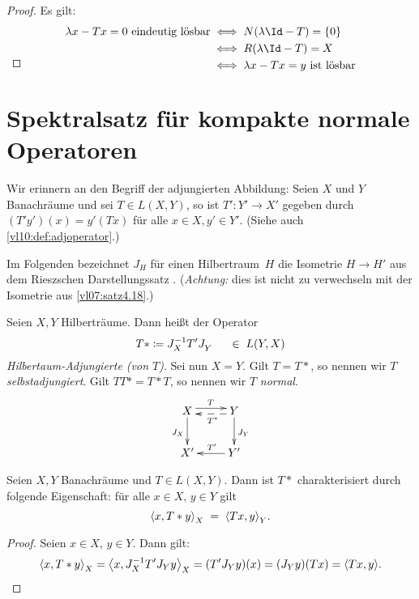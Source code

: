 \begin{proof}
    Es gilt:
    \begin{align*}
        \lambda x - Tx = 0 \text{ eindeutig lösbar}
        &\iff N(\lambda\Id-T) = \{0\}   \\
        &\iff R(\lambda\Id-T) = X       \\
        &\iff \lambda x - Tx = y \text{ ist lösbar}
        \\[-1.5\baselineskip]
    \end{align*}
\end{proof}


\chapter{Spektralsatz für kompakte normale Operatoren}
Wir erinnern an den Begriff der adjungierten Abbildung:
Seien $X$ und $Y$ Banachräume und sei $T\in L(X,Y)$,
so ist $T'\colon Y'\to X'$ gegeben durch $(T'y')(x) = y'(Tx)$
für alle $x\in X, y'\in Y'$. (Siehe auch \cref{vl10:def:adjoperator}.)

Im Folgenden bezeichnet $J_H$ für einen Hilbertraum~$H$ die Isometrie
$H\to H'$ aus dem Rieszschen Darstellungssatz .
(\emph{Achtung:} dies ist nicht zu verwechseln mit der Isometrie aus
\cref{vl07:satz4.18}.)

\begin{thDef}
    Seien $X,Y$ Hilberträume. Dann heißt der Operator
    \[ T* \coloneqq J_X^{-1} T' J_Y^{\phantom{-1}} \quad\in\; L(Y,X) \]
    \emph{Hilbertaum-Adjungierte (von $T$)}. Sei nun $X=Y$. Gilt $T=T*$,
    so nennen wir $T$ \emph{selbstadjungiert}. Gilt $TT* = T*T$, so
    nennen wir $T$ \emph{normal}.
    \[
        \xymatrix{
            X \ar@<3pt>[r]^T \ar[d]_{J_X} & 
              \ar@<2pt>@{-->}[l]^{T^{\mathrlap{\ast}}} Y \ar[d]^{J_Y}  \\
            X' & \ar[l]_{T^{\mathrlap{\prime}}} Y'
        }
    \]
\end{thDef}

\begin{thLemma}
    Seien $X,Y$ Banachräume und $T\in L(X,Y)$. Dann ist $T*$
    charakterisiert durch folgende Eigenschaft: für alle $x\in X,\,y\in Y$
    gilt
    \[ \SP{x,T*y}_X \;=\; \SP{Tx,y}_Y  . \]
\end{thLemma}

\begin{proof}
    Seien $x\in X,\,y\in Y$. Dann gilt:
    \[ \SP{x,T*y}_X = \SP{x, J_X^{-1}T'J_Yy}_X
        = (T'J_Yy)(x) = (J_Yy)(Tx) = \SP{Tx,y}
    . \]
\end{proof}

